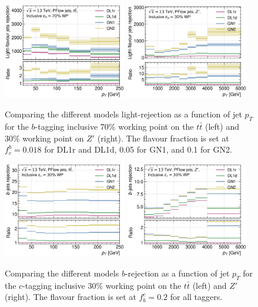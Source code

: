   \begin{figure}[h!]
    \centering
    \includegraphics[width=0.48\textwidth]{Images/FTAG/GN/GN2/pt_plots/pt_ttbar_light_rej.png}
    \includegraphics[width=0.48\textwidth]{Images/FTAG/GN/GN2/pt_plots/pt_zp_light_rej.png}
    \caption{Comparing the different models light-rejection as a function of jet $p_T$ for the $b$-tagging inclusive 70\% working point on the $t\bar{t}$ (left) and 30\% working point on $Z'$ (right). The flavour fraction is set at $f^b_c = 0.018$ for DL1r and DL1d, 0.05 for GN1, and 0.1 for GN2.}
    \label{apfig:GNxptb_urej}
  \end{figure} 
  
\begin{figure}[h!]
    \centering
    \includegraphics[width=0.48\textwidth]{Images/FTAG/GN/GN2/pt_plots/pt_ttbar_b_rej_c.png}
    \includegraphics[width=0.48\textwidth]{Images/FTAG/GN/GN2/pt_plots/pt_zp_b_rej_c.png}
    \caption{Comparing the different models $b$-rejection as a function of jet $p_T$ for the $c$-tagging inclusive 30\% working point on the $t\bar{t}$ (left) and $Z'$ (right). The flavour fraction is set at $f^c_b = 0.2$ for all taggers.}
    \label{apfig:GNxptc_brej}
  \end{figure} 
  

